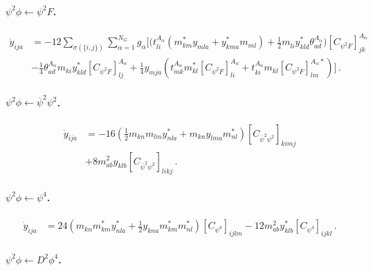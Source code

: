 \paragraph{\texorpdfstring{$\psi^2 \phi \leftarrow \psi^2 F$.}{yukfromphi2F}}

\begin{align}
    \dot y_{ija} &= -12\sum_{\sigma(\{i,j\})} \sum_{\alpha=1}^{N_G} g_\alpha \Bigg[\Bigg(t^{A_\alpha}_{li}(m_{km}^{*} y_{mla}+y_{kma}^{*} m_{ml}) 
    + \frac{1}{2}m_{li}^{\phantom *} y_{kld}^* \theta^{A_\alpha}_{ad}\Bigg)\left[C_{\psi^2F}\right]_{jk}^{A_{\alpha}}\nonumber\\ 
    &-\frac{1}{4} \theta_{ad}^{A_\alpha} m_{ki} y_{kld}^* \left[C_{\psi^2 F}\right]_{lj}^{A_\alpha}
    +\frac{1}{4}y_{mja} \left(
    t^{A_\alpha}_{mk}m^*_{kl}\left[C_{\psi^2 F}\right]^{A_\alpha}_{li}+
    t^{A_\alpha}_{ki}m_{kl}\left[C_{\psi^2 F}\right]^{A_\alpha *}_{lm}\right)
    \Bigg]
    \,.\label{yuk_psi2F}
\end{align}

\paragraph{\texorpdfstring{$\psi^2 \phi \leftarrow \overline \psi^2 \psi^2$.}{yukfrompsibar2psi2}}

\begin{align}
    \dot y_{ija} &= -16\left(\frac{1}{2} m_{kn}m_{lm}y^*_{nla}+m_{kn}y_{lma} m^*_{nl}\right)\left[C_{\overline \psi^2 \psi^2}\right]_{kimj}
    \nonumber\\
    &
    +8 m_{ab}^2 y_{klb} \left[C_{\overline \psi^2 \psi^2}\right]_{likj} \,.\label{yuk_psibar2psi2}
\end{align}

\paragraph{\texorpdfstring{$\psi^2 \phi \leftarrow \psi^4$.}{yukfrompsi4}}

\begin{align}
   \dot y_{ija} &= 24 \left(m_{kn}m_{km}^*y^*_{nla}+
    \frac{1}{2}y_{kna}m_{km}^*m^*_{nl}\right)\left[C_{\psi^4}\right]_{ijlm}
    - 12m^2_{ab}y^*_{klb} \left[C_{\psi^4}\right]_{ijkl}\,.
    \label{yuk_psi4}
\end{align}

\paragraph{$\psi^2 \phi \leftarrow D^2\phi^4$.}

